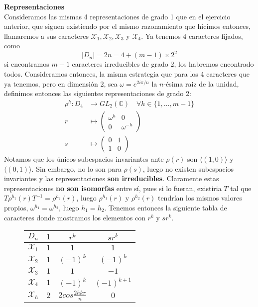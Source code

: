 \textbf{Representaciones}\\
Consideramos las mismas 4 representaciones de grado 1 que en el ejercicio anterior, que siguen existiendo por el mismo razonamiento que hicimos entonces, llamaremos a sus caracteres \(\mathcal{X}_{1}, \mathcal{X}_{2}, \mathcal{X}_{3}\) y \(\mathcal{X}_{4}\). Ya tenemos 4 caracteres fijados, como
\[
  |D_{n}| = 2n = 4 + (m-1)\times 2^{2}
\]
si encontramos \(m-1\) caracteres irreducibles de grado \(2\), los habremos encontrado todos. Consideramos entonces, la misma estrategia que para los 4 caracteres que ya tenemos, pero en dimensión 2, sea  \(\omega = e^{2i\pi / n}\) la \(n\)-ésima raiz de la unidad, definimos entonces las siguientes representaciones de grado 2:
\[
  \begin{aligned}
    \rho^{h} : D_{4} &\to GL_{2}(\mathbb{C}) \quad \forall h \in \{1,\dots,m-1\}\\
    r &\mapsto \begin{pmatrix} \omega^{h} & 0 \\ 0 &\omega^{-h} \end{pmatrix}\\
    s &\mapsto \begin{pmatrix} 0 & 1 \\ 1 & 0 \end{pmatrix}
  \end{aligned}
\]
Notamos que los únicos subespacios invariantes ante \(\rho(r)\) son \(\langle (1,0) \rangle\) y \(\langle (0,1) \rangle\). Sin embargo, no lo son para \(\rho(s)\), luego no existen subespacios invariantes y las representaciones \textbf{son irreducibles}. Claramente estas representaciones \textbf{no son isomorfas} entre sí, pues si lo fueran, existiria \(T\) tal que \(T\rho^{h_{1}}(r)T^{-1} = \rho^{h_{2}}(r)\), luego \(\rho^{h_{1}}(r)\) y \(\rho^{h_{2}}(r)\) tendrían los mismos valores propios, \(\omega^{h_{1}} = \omega^{h_{2}}\), luego \(h_{1} = h_{2}\). Tenemos entonces la siguiente tabla de caracteres donde mostramos los elementos con \(r^{k}\) y \(sr^{k}\).
\begin{figure}[H]
  \centering
  \begin{tabular}{c|ccc}
      \(D_{n}\)           & \(1\)   & \(r^{k}\)  & \(sr^{k}\) \\ \hline
      \(\mathcal{X}_{1}\) & \(1\)   &  \(1\)    &     \(1\)    \\
      \(\mathcal{X}_{2}\) & \(1\)   &  \((-1)^{k}\)     &     \((-1)^{k}\)   \\
      \(\mathcal{X}_{3}\) & \(1\)   &  \(1\) &     \(-1\)   \\
      \(\mathcal{X}_{4}\) & \(1\)   &  \((-1)^{k}\)    &     \((-1)^{k+1}\)  \\
      \(\mathcal{X}_{h}\) & \(2\)   &  \(2 cos{\frac{2hk\pi}{n}}\)    &     \(0\) \\
    \end{tabular}
\end{figure}

